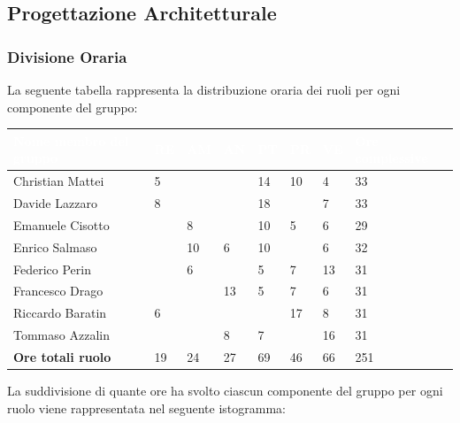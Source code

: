 \subsection{Progettazione Architetturale}

\subsubsection{Divisione Oraria}
La seguente tabella rappresenta la distribuzione oraria dei ruoli per ogni componente del gruppo:
{
\renewcommand{\arraystretch}{2}
\begin{table}[h]
\caption{Tabella della divisione oraria della Progettazione Architetturale}
\begin{longtable}{ C{5cm} C{1cm} C{1cm} C{1cm} C{1cm} C{1cm} C{1cm} C{3cm}}
	\textcolor{white}{\textbf{Nome membro del gruppo}} & 
	\textcolor{white}{\textbf{RE}} & 
	\textcolor{white}{\textbf{AM}} & 
	\textcolor{white}{\textbf{AN}} & 
	\textcolor{white}{\textbf{PT}} & 
	\textcolor{white}{\textbf{PR}} & 
	\textcolor{white}{\textbf{VE}} & 
	\textcolor{white}{\textbf{Ore complessive}}\\	
	\endhead
        
    Christian Mattei & 5 & & & 14 & 10 & 4 & 33\\
    Davide Lazzaro & 8 & & & 18 & & 7 & 33 \\
    Emanuele Cisotto & & 8 & & 10 & 5 & 6 & 29 \\
    Enrico Salmaso & & 10 & 6 & 10 & & 6 & 32 \\
    Federico Perin & & 6 & & 5 & 7 & 13 &  31\\
    Francesco Drago & & & 13 & 5 & 7 & 6 & 31 \\
    Riccardo Baratin & 6 & & & & 17 & 8 & 31\\
    Tommaso Azzalin & & & 8 & 7 & & 16 & 31\\
	\textbf{Ore totali ruolo} & 19 & 24 & 27 & 69 & 46 & 66 & 251\\
		
	\end{longtable}
\end{table}
}
\newline
La suddivisione di quante ore ha svolto ciascun componente del gruppo per ogni ruolo viene rappresentata nel seguente istogramma:

